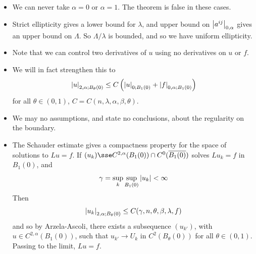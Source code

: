 \documentclass{article}
\begin{document}
\begin{remark}
    \begin{itemize}
        \item We can never take \(\alpha = 0\) or \(\alpha = 1\). The theorem is false in these cases.
        \item Strict ellipticity gives a lower bound for \(\lambda\), and upper bound on \(\abs{a^{ij}}_{0, \alpha}\) gives an upper bound on \(\Lambda\). So \(\Lambda/\lambda\) is bounded, and so we have uniform ellipticity.
        \item Note that we can control two derivatives of \(u\) using no derivatives on \(u\) or \(f\).
        \item 
        We will in fact strengthen this to
        \[\abs{u}_{2, \alpha; B_\theta(0)} \le C\left(\abs{u}_{0; B_1(0)} + \abs{f}_{0, \alpha; B_1(0)}\right)\]
        for all \(\theta \in (0, 1)\), \(C = C(n, \lambda, \alpha, \beta, \theta)\). 
        \item We may no assumptions, and state no conclusions, about the regularity on the boundary.
        \item The Schauder estimate gives a compactness property for the space of solutions to \(Lu = f\).
        If \((u_k) \sse C^{2, \alpha}(B_1(0)) \cap C^0(\overline{B_1(0)})\) solves \(Lu_k = f\) in \(B_1(0)\), and
        \[\gamma = \sup_k \sup_{B_1(0)}\abs{u_k} < \infty\]
        Then 
        \[\abs{u_k}_{2, \alpha; B_\theta(0)} \le C(\gamma, n, \theta, \beta, \lambda, f)\]
        and so by Arzela-Ascoli, there exists a subsequence \((u_{k'})\), with \(u \in C^{2, \alpha}(B_1(0))\), such that \(u_{k'} \to U_k\) in \(C^2(B_{\theta}(0))\) for all \(\theta \in (0, 1)\). Passing to the limit, \(Lu = f\).
    \end{itemize}
\end{remark}

\lec
\end{document}

